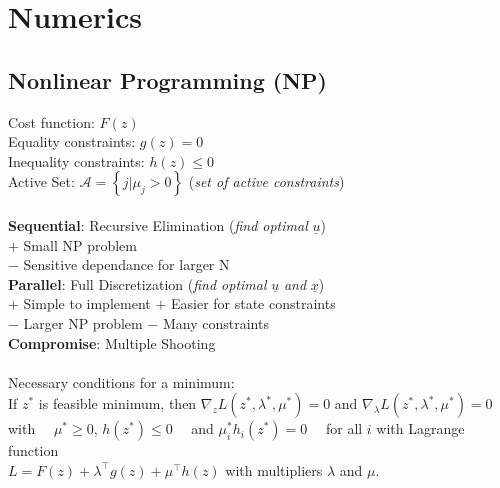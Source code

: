 \documentclass[english]{latex4ei/latex4ei_sheet}
\begin{document}
\section{Numerics}
\begin{sectionbox}

\subsection{Nonlinear Programming (NP)}
Cost function: $F(z)$\\
Equality constraints: $g(z)=0$\\
Inequality constraints: $h(z)\leq 0$\\
Active Set: $\mathcal{A}=\left\{j | \mu_{j}>0\right\}$ (\textit{set of active constraints})
\\ \\
\textbf{Sequential}: Recursive Elimination (\textit{find optimal} $\underline{u}$)\\
$+$ Small NP problem\\
$-$ Sensitive dependance for larger N
\vspace{0.1cm}\\
\textbf{Parallel}: Full Discretization (\textit{find optimal} $\underline{u}$ \textit{and} $\underline{x}$)\\
$+$ Simple to implement \qquad $+$ Easier for state constraints\\
$-$ Larger NP problem \; \qquad $-$ Many constraints
\vspace{0.1cm}\\
\textbf{Compromise}: Multiple Shooting
\\ \\
Necessary conditions for a minimum:\\
If $z^{*}$ is feasible minimum, then $\nabla_{z} L\left(z^{*}, \lambda^{*}, \mu^{*}\right)=0$ and $\nabla_{\lambda} L\left(z^{*}, \lambda^{*}, \mu^{*}\right)=0\quad$ with $\quad\mu^{*} \geq 0$, $h\left(z^{*}\right) \leq 0\quad$ and $\mu_{i}^{*} h_{i}\left(z^{*}\right)=0\quad$ for all $i$ with Lagrange function\\ $L=F(z)+\lambda^{\top} g(z)+\mu^{\top} h(z)$ with multipliers $\lambda$ and $\mu$.\\


\end{sectionbox}
\end{document}
